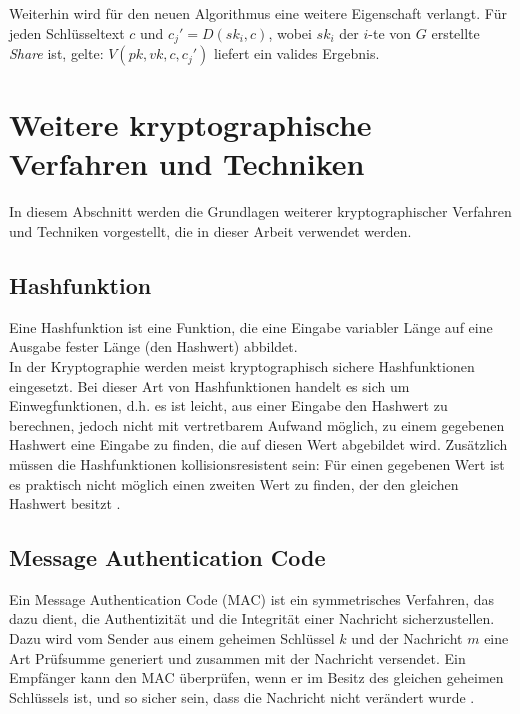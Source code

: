 Weiterhin wird für den neuen Algorithmus eine weitere Eigenschaft verlangt. Für jeden Schlüsseltext \(c\) und \(c_j' = D(sk_i,c)\), wobei \(sk_i\) der \(i\)-te von \(G\) erstellte \textit{Share} ist, gelte: \(V(pk, vk, c, c_j')\) liefert ein valides Ergebnis.



\section{Weitere kryptographische Verfahren und Techniken}

In diesem Abschnitt werden die Grundlagen weiterer kryptographischer Verfahren und Techniken vorgestellt, die in dieser Arbeit verwendet werden.


\subsection{Hashfunktion}

Eine Hashfunktion ist eine Funktion, die eine Eingabe variabler Länge auf eine Ausgabe fester Länge (den Hashwert) abbildet.\\
In der Kryptographie werden meist kryptographisch sichere Hashfunktionen eingesetzt. Bei dieser Art von Hashfunktionen handelt es sich um Einwegfunktionen, d.h. es ist leicht, aus einer Eingabe den Hashwert zu berechnen, jedoch nicht mit vertretbarem Aufwand möglich, zu einem gegebenen Hashwert eine Eingabe zu finden, die auf diesen Wert abgebildet wird. Zusätzlich müssen die Hashfunktionen kollisionsresistent sein: Für einen gegebenen Wert ist es praktisch nicht möglich einen zweiten Wert zu finden, der den gleichen Hashwert besitzt \cite{Schneier2006}.

\subsection{Message Authentication Code}

\label{sec_mac}

Ein Message Authentication Code (MAC) ist ein symmetrisches Verfahren, das dazu dient, die Authentizität und die Integrität einer Nachricht sicherzustellen. Dazu wird vom Sender aus einem geheimen Schlüssel \(k\) und der Nachricht \(m\) eine Art Prüfsumme generiert und zusammen mit der Nachricht versendet. Ein Empfänger kann den MAC überprüfen, wenn er im Besitz des gleichen geheimen Schlüssels ist, und so sicher sein, dass die Nachricht nicht verändert wurde \cite{Schneier2006}.

